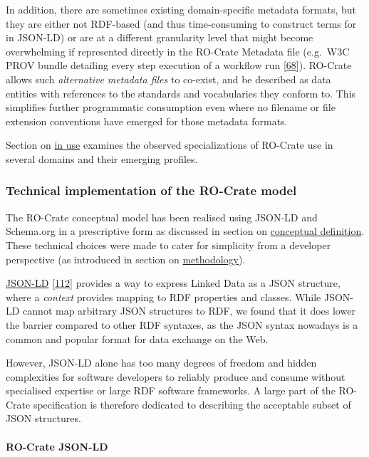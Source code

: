 In addition, there are sometimes existing domain-specific metadata
formats, but they are either not RDF-based (and thus time-consuming to
construct terms for in JSON-LD) or are at a different granularity level
that might become overwhelming if represented directly in the RO-Crate
Metadata file (e.g.~W3C PROV bundle detailing every step execution of a
workflow run
{[}\href{https://doi.org/10.1093/gigascience/giz095}{68}{]}). RO-Crate
allows such \emph{alternative metadata files} to co-exist, and be
described as data entities with references to the standards and
vocabularies they conform to. This simplifies further programmatic
consumption even where no filename or file extension conventions have
emerged for those metadata formats.

Section on \protect\hyperlink{inuse}{in use} examines the observed
specializations of RO-Crate use in several domains and their emerging
profiles.

\hypertarget{implementation}{%
\subsubsection{Technical implementation of the RO-Crate
model}\label{implementation}}

The RO-Crate conceptual model has been realised using JSON-LD and
Schema.org in a prescriptive form as discussed in section on
\protect\hyperlink{conceptual}{conceptual definition}. These technical
choices were made to cater for simplicity from a developer perspective
(as introduced in section on
\protect\hyperlink{methodology}{methodology}).

\href{https://json-ld.org/}{JSON-LD}
\href{https://www.w3.org/TR/2014/REC-json-ld-20140116/}{{[}112{]}}
provides a way to express Linked Data as a JSON structure, where a
\emph{context} provides mapping to RDF properties and classes. While
JSON-LD cannot map arbitrary JSON structures to RDF, we found that it
does lower the barrier compared to other RDF syntaxes, as the JSON
syntax nowadays is a common and popular format for data exchange on the
Web.

However, JSON-LD alone has too many degrees of freedom and hidden
complexities for software developers to reliably produce and consume
without specialised expertise or large RDF software frameworks. A large
part of the RO-Crate specification is therefore dedicated to describing
the acceptable subset of JSON structures.

\hypertarget{jsonld}{%
\paragraph{RO-Crate JSON-LD}\label{jsonld}}

